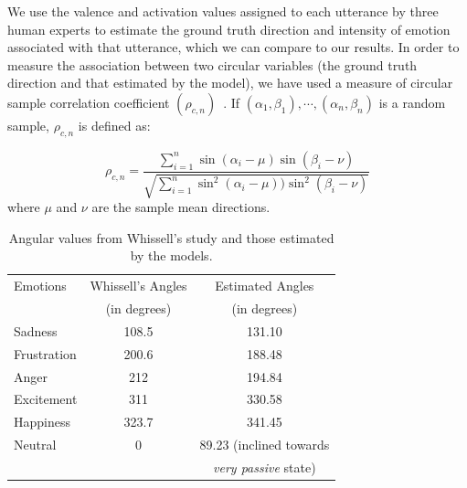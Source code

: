 \documentclass[10pt,journal,cspaper,compsoc]{IEEEtran}
\begin{document}
We use the valence and activation values assigned to each utterance by three human experts to estimate the ground truth direction and intensity of emotion associated with that utterance, which we can compare to our results. In order to measure the association between two circular variables (the ground truth direction and that estimated by the model), we have used a measure of circular sample correlation coefficient $(\rho_{c,n})$~\cite{jammalamadaka2001topics}. If $(\alpha_{1},\beta_{1}),\cdots,(\alpha_{n},\beta_{n})$ is a random sample, $\rho_{c,n}$ is defined as:

\begin{equation}
\rho_{c,n}=\frac{\sum \limits_{i=1}^n \sin(\alpha_{i}-\mu)\sin(\beta_{i}-\nu)}{\sqrt{ \sum \limits_{i=1}^n \sin^{2}(\alpha_{i}-\mu))\sin^{2}(\beta_{i}-\nu)}}
\end{equation}
where $\mu$ and $\nu$ are the sample mean directions.

\begin{table}[tp!]
\caption{Angular values from Whissell's study and those estimated by the models.}
\begin{center}
\begin{tabular}{|l|c|c|}
\hline
Emotions & Whissell's Angles & Estimated Angles \\
 & (in degrees) & (in degrees) \\
\hline
Sadness & 108.5 &  131.10  \\
\hline
Frustration & 200.6 &  188.48  \\
\hline
Anger & 212 &  194.84  \\
\hline
Excitement & 311 &  330.58  \\
\hline
Happiness & 323.7 &  341.45  \\
\hline
Neutral & 0 &   89.23 (inclined towards \\ 
 & & \emph{very passive} state) \\
\hline
\end{tabular}
\end{center}
\label{tab:angles}
\end{table}
\end{document}
